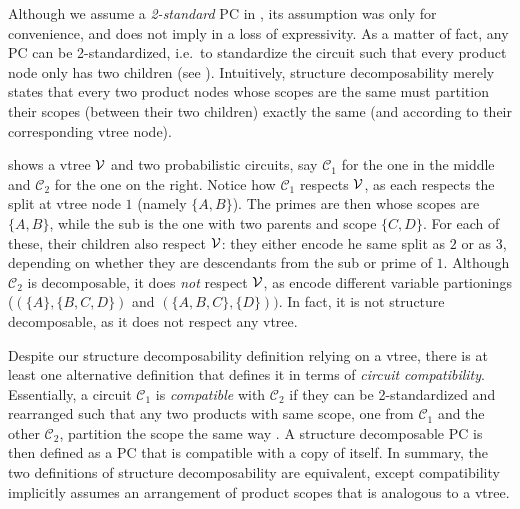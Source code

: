 Although we assume a \emph{2-standard} PC in , its assumption was only for
convenience, and does not imply in a loss of expressivity. As a matter of fact, any PC can be
2-standardized, i.e.\ to standardize the circuit such that every product node only has two children
(see ). Intuitively, structure decomposability merely states that every two
product nodes whose scopes are the same must partition their scopes (between their two children)
exactly the same (and according to their corresponding vtree node).

 shows a vtree $\operatorname{\mathcal{V}}$ and two probabilistic circuits, say
$\mathcal{C}_1$ for the one in the middle and $\mathcal{C}_2$ for the one on the right. Notice how
$\mathcal{C}_1$ respects $\operatorname{\mathcal{V}}$, as each \inode[fill=boxred!70]{\newProdNode} respects the split
at vtree node $1$ (namely $\{A,B\}$). The primes are then \inode[fill=boxpurple!60]{\newSumNode}
whose scopes are $\{A,B\}$, while the sub is the one with two parents and scope $\{C,D\}$. For each
of these, their children \inode[fill=boxbrown!60]{\newProdNode} also respect $\operatorname{\mathcal{V}}$: they either
encode he same split as $2$ or as $3$, depending on whether they are descendants from the sub or
prime of $1$. Although $\mathcal{C}_2$ is decomposable, it does \emph{not} respect $\operatorname{\mathcal{V}}$, as
\inode[fill=boxred!70]{\newProdNode} encode different variable partionings ($(\{A\},\{B,C,D\})$ and
$(\{A,B,C\},\{D\}))$. In fact, it is not structure decomposable, as it does not respect any vtree.

Despite our structure decomposability definition relying on a vtree, there is at least one
alternative definition that defines it in terms of \emph{circuit compatibility}. Essentially, a
circuit $\mathcal{C}_1$ is \emph{compatible} with $\mathcal{C}_2$ if they can be 2-standardized and
rearranged such that any two products with same scope, one from $\mathcal{C}_1$ and the other
$\mathcal{C}_2$, partition the scope the same way \citep{vergari21}. A structure decomposable PC is
then defined as a PC that is compatible with a copy of itself. In summary, the two definitions of
structure decomposability are equivalent, except compatibility implicitly assumes an arrangement of
product scopes that is analogous to a vtree.

